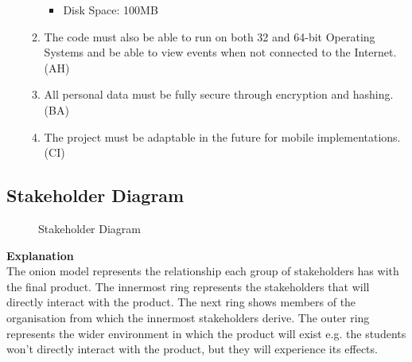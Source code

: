 \documentclass[a4paper]{article}
\begin{document}
\begin{enumerate}
\begin{enumerate}[label=NF\arabic*.]
\begin{itemize}
        \item Disk Space: 100MB
      \end{itemize}
      \item The code must also be able to run on both 32 and 64-bit Operating Systems and be able to view events when not connected to the Internet. (AH)
      \item All personal data must be fully secure through encryption and hashing. (BA)
      \item The project must be adaptable in the future for mobile implementations. (CI)
  \end{enumerate}
\end{enumerate}

\clearpage %
\subsection{Stakeholder Diagram}

\begin{figure}[!ht]
    \centering
    \caption{Stakeholder Diagram}
    \label{fig:stakeholder}
\end{figure}

\textbf{Explanation} \\
The onion model represents the relationship each group of stakeholders has with the final product. The innermost ring represents the stakeholders that will directly interact with the product. The next ring shows members of the organisation from which the innermost stakeholders derive. The outer ring represents the wider environment in which the product will exist e.g. the students won't directly interact with the product, but they will experience its effects.
\end{document}
